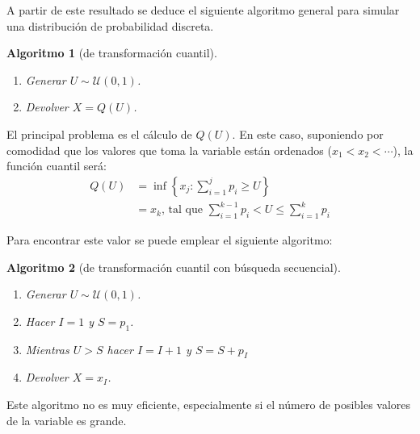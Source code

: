 \documentclass[
]{book}
\theoremstyle{break}
\newtheorem{conjecture}{Algoritmo}[chapter]
\theoremstyle{nonumberplain}
\begin{document}
A partir de este resultado se deduce el siguiente algoritmo general para simular una distribución de probabilidad discreta.

\begin{conjecture}[de transformación cuantil]

\begin{enumerate}
\def\labelenumi{\arabic{enumi}.}
\item
  Generar \(U\sim \mathcal{U}\left( 0,1\right)\).
\item
  Devolver \(X=Q\left( U\right)\).
\end{enumerate}

\end{conjecture}

El principal problema es el cálculo de \(Q\left( U\right)\).
En este caso, suponiendo por comodidad que los valores que toma la variable están ordenados (\(x_{1}<x_{2}<\cdots\)), la función cuantil será:
\[\begin{array}{ll}
Q\left( U\right) &=\inf \left\{ x_{j}:\sum_{i=1}^{j}p_{i}\geq U\right\} \\
&=x_{k}\text{, tal que }\sum_{i=1}^{k-1}p_{i}<U\leq \sum_{i=1}^{k}p_{i}
\end{array}\]

Para encontrar este valor se puede emplear el siguiente algoritmo:

\begin{conjecture}[de transformación cuantil con búsqueda secuencial]

\begin{enumerate}
\def\labelenumi{\arabic{enumi}.}
\item
  Generar \(U\sim \mathcal{U}\left( 0,1\right)\).
\item
  Hacer \(I=1\) y \(S=p_{1}\).
\item
  Mientras \(U>S\) hacer \(I=I+1\) y \(S=S+p_{I}\)
\item
  Devolver \(X=x_{I}\).
\end{enumerate}

\end{conjecture}

Este algoritmo no es muy eficiente, especialmente si el número de posibles valores de la variable es grande.
\end{document}
